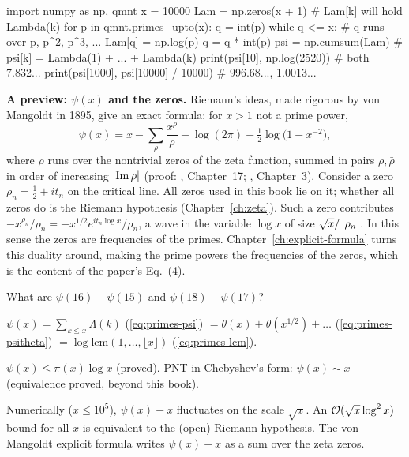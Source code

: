 \begin{pycode}
import numpy as np, qmnt
x = 10000
Lam = np.zeros(x + 1)                 # Lam[k] will hold Lambda(k)
for p in qmnt.primes_upto(x):
    q = int(p)
    while q <= x:                     # q runs over p, p^2, p^3, ...
        Lam[q] = np.log(p)
        q = q * int(p)
psi = np.cumsum(Lam)                  # psi[k] = Lambda(1) + ... + Lambda(k)
print(psi[10], np.log(2520))          # both 7.832...
print(psi[1000], psi[10000] / 10000)  # 996.68..., 1.0013...
\end{pycode}

\begin{beyond}
\textbf{A preview: $\psi(x)$ and the zeros.} Riemann's ideas, made rigorous by von Mangoldt in 1895, give an exact formula: for $x>1$ not a prime power,
\[
\psi(x)=x-\sum_{\rho}\frac{x^{\rho}}{\rho}-\log(2\pi)-\tfrac12\log\bigl(1-x^{-2}\bigr),
\]
where $\rho$ runs over the nontrivial zeros of the zeta function, summed in pairs $\rho,\bar\rho$ in order of increasing $\left\lvert \operatorname{Im}\rho\right\rvert$ (proof: \cite{davenport}, Chapter~17; \cite{edwards}, Chapter~3). Consider a zero $\rho_n=\tfrac12+it_n$ on the critical line. All zeros used in this book lie on it; whether all zeros do is the Riemann hypothesis (Chapter~\ref{ch:zeta}). Such a zero contributes $-x^{\rho_n}/\rho_n=-x^{1/2}e^{it_n\log x}/\rho_n$, a wave in the variable $\log x$ of size $\sqrt x/\left\lvert \rho_n\right\rvert$. In this sense the zeros are frequencies of the primes. Chapter~\ref{ch:explicit-formula} turns this duality around, making the prime powers the frequencies of the zeros, which is the content of the paper's Eq.~(4).
\end{beyond}

\begin{checkpoint}
What are $\psi(16)-\psi(15)$ and $\psi(18)-\psi(17)$?
\end{checkpoint}

\begin{keyideas}
\item $\psi(x)=\sum_{k\le x}\Lambda(k)$ (\cref{eq:primes-psi}) $=\theta(x)+\theta(x^{1/2})+\dots$ (\cref{eq:primes-psitheta}) $=\log\mathrm{lcm}(1,\dots,\lfloor x\rfloor)$ (\cref{eq:primes-lcm}).
\item $\psi(x)\le\pi(x)\log x$ (proved). PNT in Chebyshev's form: $\psi(x)\sim x$ (equivalence proved, beyond this book).
\item Numerically ($x\le10^5$), $\psi(x)-x$ fluctuates on the scale $\sqrt x$. An $\mathcal{O}(\sqrt x\log^2x)$ bound for all $x$ is equivalent to the (open) Riemann hypothesis. The von Mangoldt explicit formula writes $\psi(x)-x$ as a sum over the zeta zeros.
\end{keyideas}

